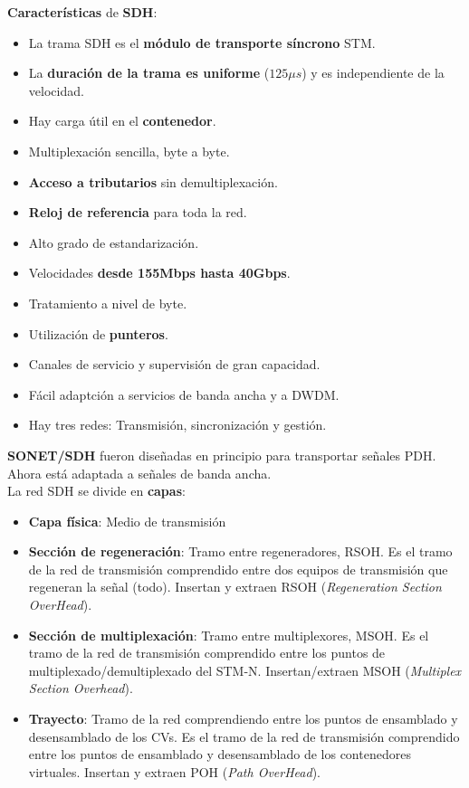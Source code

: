 \documentclass[10pt,portrait, twocolumn]{article}
\begin{document}
\textbf{Características} de \textbf{SDH}:

\begin{itemize}
\item La trama SDH es el \textbf{módulo de transporte síncrono} STM. 
\item La \textbf{duración de la trama es uniforme} ($125 \mu s$) y es independiente de la velocidad. 
\item Hay carga útil en el \textbf{contenedor}. 
\item Multiplexación sencilla, byte a byte. 
\item \textbf{Acceso a tributarios} sin demultiplexación. 
\item \textbf{Reloj de referencia} para toda la red. 
\item Alto grado de estandarización.
\item  Velocidades \textbf{desde 155Mbps hasta 40Gbps}.
\item  Tratamiento a nivel de byte. 
\item Utilización de \textbf{punteros}. 
\item Canales de servicio y supervisión de gran capacidad. 
\item Fácil adaptción a servicios de banda ancha y a DWDM. 
\item Hay tres redes: Transmisión, sincronización y gestión.
\end{itemize}

\textbf{SONET/SDH} fueron diseñadas en principio para transportar señales PDH. Ahora está adaptada a señales de banda ancha.\\

La red SDH se divide en \textbf{capas}:

	\begin{itemize}
	\item \textbf{Capa física}: Medio de transmisión
	\item \textbf{Sección de regeneración}: Tramo entre regeneradores, RSOH. Es el tramo de la red de transmisión comprendido entre dos equipos de transmisión que regeneran la señal (todo). Insertan y extraen RSOH (\textit{Regeneration Section OverHead}).
	\item \textbf{Sección de multiplexación}: Tramo entre multiplexores, MSOH. Es el tramo de la red de transmisión comprendido entre los puntos de multiplexado/demultiplexado del STM-N. Insertan/extraen MSOH (\textit{Multiplex Section Overhead}).
	\item \textbf{Trayecto}: Tramo de la red comprendiendo entre los puntos de ensamblado y desensamblado de los CVs. Es el tramo de la red de transmisión comprendido entre los puntos de ensamblado y desensamblado de los contenedores virtuales. Insertan y extraen POH (\textit{Path OverHead}).
	\end{itemize}
\end{document}
